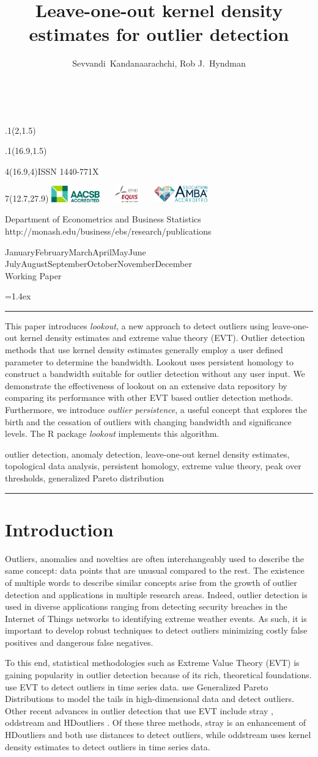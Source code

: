 \documentclass[11pt,a4paper,]{article}
\title{Leave-one-out kernel density estimates for outlier detection}
\author{Sevvandi~Kandanaarachchi, Rob J.~Hyndman}
\date{\sf\Date~\Month~\Year}
\makeatletter
\def\Date{\number\day}
\def\Month{\ifcase\month\or
 January\or February\or March\or April\or May\or June\or
 July\or August\or September\or October\or November\or December\fi}
\def\Year{\number\year}
\def\showjel{{\large\textsf{\textbf{JEL classification:}}~\@jel}}
\def\cover{{\sffamily\setcounter{page}{0}
        \thispagestyle{empty}
        \placefig{2}{1.5}{width=5cm}{monash2}
        \placefig{16.9}{1.5}{width=2.1cm}{MBusSchool}
        \begin{textblock}{4}(16.9,4)ISSN 1440-771X\end{textblock}
        \begin{textblock}{7}(12.7,27.9)\hfill
        \includegraphics[height=0.7cm]{AACSB}~~~
        \includegraphics[height=0.7cm]{EQUIS}~~~
        \includegraphics[height=0.7cm]{AMBA}
        \end{textblock}
        \vspace*{2cm}
        \begin{center}\Large
        Department of Econometrics and Business Statistics\\[.5cm]
        \footnotesize http://monash.edu/business/ebs/research/publications
        \end{center}\vspace{2cm}
        \begin{center}
        \fbox{\parbox{14cm}{\begin{onehalfspace}\centering\Huge\vspace*{0.3cm}
                \textsf{\textbf{\expandafter{\@title}}}\vspace{1cm}\par
                \LARGE\@author\end{onehalfspace}
        }}
        \end{center}
        \vfill
                \begin{center}\Large
                \Month~\Year\\[1cm]
                Working Paper \@wp
        \end{center}\vspace*{2cm}}}
\def\pageone{{\sffamily\setstretch{1}%
        \thispagestyle{empty}%
        \vbox to \textheight{%
        \raggedright\baselineskip=1.2cm
     {\fontsize{24.88}{30}\sffamily\textbf{\expandafter{\@title}}}
        \vspace{2cm}\par
        \hspace{1cm}\parbox{14cm}{\sffamily\large\@addresses}\vspace{1cm}\vfill
        \hspace{1cm}{\large\Date~\Month~\Year}\\[1cm]
        \hspace{1cm}\showjel\vss}}}
\def\blindtitle{{\sffamily
     \thispagestyle{plain}\raggedright\baselineskip=1.2cm
     {\fontsize{24.88}{30}\sffamily\textbf{\expandafter{\@title}}}\vspace{1cm}\par
        }}
\def\titlepage{{\cover\newpage\pageone\newpage\blindtitle}}
\let\maketitle\titlepage
\newenvironment{keywords}{\par\vspace{0.5cm}\noindent{\sffamily\textbf{Keywords:}}}{\vspace{0.25cm}\par\hrule\vspace{0.5cm}\par}
\renewenvironment{abstract}{\begin{minipage}{\textwidth}\parskip=1.4ex\noindent
\hrule\vspace{0.1cm}\par{\sffamily\textbf{\abstractname}}\newline}
  {\end{minipage}}
\def\placefig#1#2#3#4{\begin{textblock}{.1}(#1,#2)\rlap{\texttt{[image: \#4]}}\end{textblock}}
\theoremstyle{definition}
\theoremstyle{definition}
\theoremstyle{definition}
\theoremstyle{remark}
\makeatother
\begin{document}
\maketitle
\begin{abstract}
This paper introduces \emph{lookout}, a new approach to detect outliers using leave-one-out kernel density estimates and extreme value theory (EVT). Outlier detection methods that use kernel density estimates generally employ a user defined parameter to determine the bandwidth. Lookout uses persistent homology to construct a bandwidth suitable for outlier detection without any user input. We demonstrate the effectiveness of lookout on an extensive data repository by comparing its performance with other EVT based outlier detection methods. Furthermore, we introduce \emph{outlier persistence}, a useful concept that explores the birth and the cessation of outliers with changing bandwidth and significance levels. The R package \emph{lookout} implements this algorithm.
\end{abstract}
\begin{keywords}
outlier detection, anomaly detection, leave-one-out kernel density estimates, topological data analysis, persistent homology, extreme value theory, peak over thresholds, generalized Pareto distribution
\end{keywords}

\hypertarget{introduction}{%
\section{Introduction}\label{introduction}}

Outliers, anomalies and novelties are often interchangeably used to describe the same concept: data points that are unusual compared to the rest. The existence of multiple words to describe similar concepts arise from the growth of outlier detection and applications in multiple research areas. Indeed, outlier detection is used in diverse applications ranging from detecting security breaches in the Internet of Things networks to identifying extreme weather events. As such, it is important to develop robust techniques to detect outliers minimizing costly false positives and dangerous false negatives.

To this end, statistical methodologies such as Extreme Value Theory (EVT) is gaining popularity in outlier detection because of its rich, theoretical foundations. \textcite{Burridge2006} use EVT to detect outliers in time series data. \textcite{Clifton2014} use Generalized Pareto Distributions to model the tails in high-dimensional data and detect outliers. Other recent advances in outlier detection that use EVT include stray \autocite{pridiltal}, oddstream \autocite{talagala2019anomaly} and HDoutliers \autocite{wilkinson2017visualizing}. Of these three methods, stray is an enhancement of HDoutliers and both use distances to detect outliers, while oddstream uses kernel density estimates to detect outliers in time series data.
\end{document}
